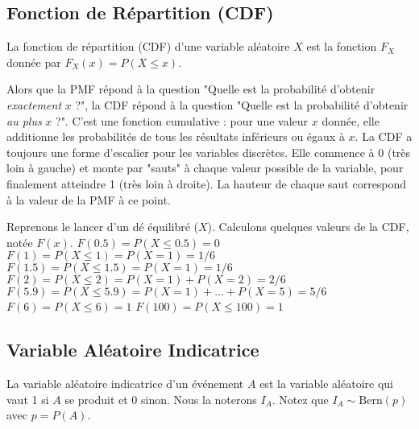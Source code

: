 \subsection{Fonction de Répartition (CDF)}

\begin{definitionbox}
La fonction de répartition (CDF) d'une variable aléatoire $X$ est la fonction $F_X$ donnée par $F_X(x) = P(X \le x)$.
\end{definitionbox}

\begin{intuitionbox}
Alors que la PMF répond à la question "Quelle est la probabilité d'obtenir \textit{exactement} $x$ ?", la CDF répond à la question "Quelle est la probabilité d'obtenir \textit{au plus} $x$ ?". C'est une fonction cumulative : pour une valeur $x$ donnée, elle additionne les probabilités de tous les résultats inférieurs ou égaux à $x$.
La CDF a toujours une forme d'escalier pour les variables discrètes. Elle commence à 0 (très loin à gauche) et monte par "sauts" à chaque valeur possible de la variable, pour finalement atteindre 1 (très loin à droite). La hauteur de chaque saut correspond à la valeur de la PMF à ce point.
\end{intuitionbox}

\begin{examplebox}
Reprenons le lancer d'un dé équilibré ($X$). Calculons quelques valeurs de la CDF, notée $F(x)$.
\newline
$F(0.5) = P(X \le 0.5) = 0$
\newline
$F(1) = P(X \le 1) = P(X=1) = 1/6$
\newline
$F(1.5) = P(X \le 1.5) = P(X=1) = 1/6$
\newline
$F(2) = P(X \le 2) = P(X=1) + P(X=2) = 2/6$
\newline
$F(5.9) = P(X \le 5.9) = P(X=1) + \dots + P(X=5) = 5/6$
\newline
$F(6) = P(X \le 6) = 1$
\newline
$F(100) = P(X \le 100) = 1$
\end{examplebox}

\subsection{Variable Aléatoire Indicatrice}

\begin{definitionbox}
La variable aléatoire indicatrice d'un événement $A$ est la variable aléatoire qui vaut 1 si $A$ se produit et 0 sinon. Nous la noterons $I_A$. Notez que $I_A \sim \text{Bern}(p)$ avec $p=P(A)$.
\end{definitionbox}

